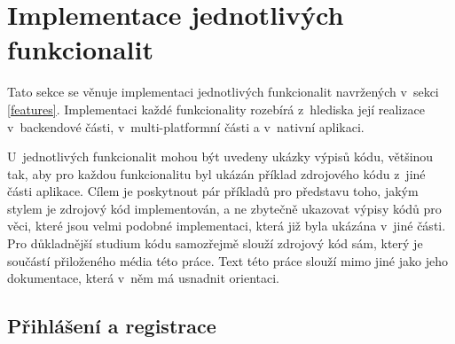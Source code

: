 \section{Implementace jednotlivých funkcionalit}

Tato sekce se věnuje implementaci jednotlivých funkcionalit navržených v~sekci \ref{features}. Implementaci každé funkcionality rozebírá z~hlediska její realizace v~backendové části, v~multi-platformní části a v~nativní aplikaci. 

U~jednotlivých funkcionalit mohou být uvedeny ukázky výpisů kódu, většinou tak, aby pro každou funkcionalitu byl ukázán příklad zdrojového kódu z~jiné části aplikace. Cílem je poskytnout pár příkladů pro představu toho, jakým stylem je zdrojový kód implementován, a ne zbytečně ukazovat výpisy kódů pro věci, které jsou velmi podobné implementaci, která již byla ukázána v~jiné části. Pro důkladnější studium kódu samozřejmě slouží zdrojový kód sám, který je součástí přiloženého média této práce. Text této práce slouží mimo jiné jako jeho dokumentace, která v~něm má usnadnit orientaci.

\subsection{Přihlášení a registrace}\label{onboarding-impl}


